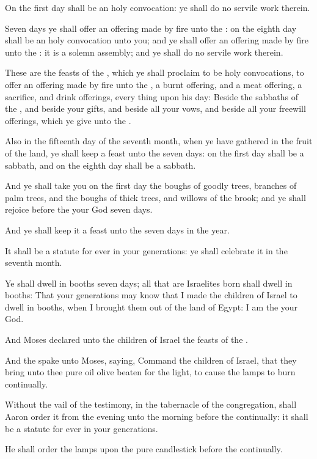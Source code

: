 \Verse On the first day shall be an holy convocation: ye shall do no servile work therein.

\Verse Seven days ye shall offer an offering made by fire unto the \LORD: on the eighth day shall be an holy convocation unto you; and ye shall offer an offering made by fire unto the \LORD: it is a solemn assembly; and ye shall do no servile work therein.

\Verse These are the feasts of the \LORD, which ye shall proclaim to be holy convocations, to offer an offering made by fire unto the \LORD, a burnt offering, and a meat offering, a sacrifice, and drink offerings, every thing upon his day: \Verse Beside the sabbaths of the \LORD, and beside your gifts, and beside all your vows, and beside all your freewill offerings, which ye give unto the \LORD.

\Verse Also in the fifteenth day of the seventh month, when ye have gathered in the fruit of the land, ye shall keep a feast unto the \LORD seven days: on the first day shall be a sabbath, and on the eighth day shall be a sabbath.

\Verse And ye shall take you on the first day the boughs of goodly trees, branches of palm trees, and the boughs of thick trees, and willows of the brook; and ye shall rejoice before the \LORD your God seven days.

\Verse And ye shall keep it a feast unto the \LORD seven days in the year.

It shall be a statute for ever in your generations: ye shall celebrate it in the seventh month.

\Verse Ye shall dwell in booths seven days; all that are Israelites born shall dwell in booths: \Verse That your generations may know that I made the children of Israel to dwell in booths, when I brought them out of the land of Egypt: I am the \LORD your God.

\Verse And Moses declared unto the children of Israel the feasts of the \LORD.

\Chapter
\Verse And the \LORD spake unto Moses, saying, \Verse Command the children of Israel, that they bring unto thee pure oil olive beaten for the light, to cause the lamps to burn continually.

\Verse Without the vail of the testimony, in the tabernacle of the congregation, shall Aaron order it from the evening unto the morning before the \LORD continually: it shall be a statute for ever in your generations.

\Verse He shall order the lamps upon the pure candlestick before the \LORD continually.

